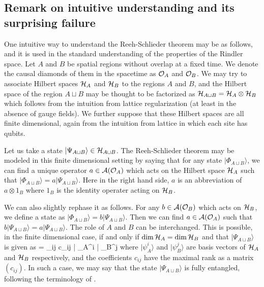 \documentclass[a4paper,11pt]{article}
\theoremstyle{plain}
\theoremstyle{definition}
\numberwithin{thm}{section}
\newcommand{\ket}[1]{ | {#1} \rangle }
\def\CA{{\cal A}}
\def\CH{{\cal H}}
\def\CO{{\cal O}}
\def\beq#1\eeq{\begin{align}#1\end{align}}
\begin{document}
\subsection{Remark on intuitive understanding and its surprising failure}


One intuitive way to understand the Reeh-Schlieder theorem may be as follows, and it is used in the standard understanding of the properties of the Rindler space.
Let $A$ and $B$ be spatial regions without overlap at a fixed time. We denote the causal diamonds of them in the spacetime as $\CO_A$ and $\CO_B$.
We may try to associate Hilbert spaces $\CH_A$ and $\CH_B$ to the regions $A$ and $B$, and the Hilbert space of the region $A \sqcup B$
may be thought to be factorized as $\CH_{A \sqcup B} =\CH_A \otimes \CH_B$ which follows from the intuition from lattice regularization (at least in the absence of gauge fields). 
We further suppose that these Hilbert spaces are all finite dimensional, again from the intuition from lattice in which each site has qubits.

Let us take a state $\ket{\Psi_{A \sqcup B}} \in \CH_{A \sqcup B}$. The Reeh-Schlieder theorem may be modeled in this finite dimensional setting
by saying that for any state $\ket{\Phi_{A \sqcup B}} $,
we can find a unique operator $a \in \CA(\CO_A)$ which acts on the Hilbert space $\CH_A$ such that $\ket{\Phi_{A \sqcup B}} = a \ket{\Psi_{A \sqcup B}}$.
Here in the right hand side, $a$ is an abbreviation of $a \otimes 1_B$ where $1_B$ is the identity operater acting on $\CH_B$.

We can also slightly rephase it as follows. For any $b \in \CA(\CO_B)$ which acts on $\CH_B$, we define a state as $\ket{\Phi_{A \sqcup B}} =b \ket{\Psi_{A \sqcup B}} $.
Then we can find $a \in \CA(\CO_A)$ such that $b \ket{\Psi_{A \sqcup B}} = a \ket{\Psi_{A \sqcup B}}$. The role of $A$ and $B$ can be interchanged.
This is possible, in the finite dimensional case, if and only if $\dim \CH_A = \dim \CH_B$ and that
$\ket{\Psi_{A \sqcup B}}$ is given as
\beq
\ket{\Psi_{A \sqcup B}} = \sum_{ij} c_{ij}\ket{\psi_A^i} \otimes \ket{\psi_B^j}
\eeq
where $\ket{\psi_A^i} $ and $ \ket{\psi_B^j}$ are basis vectors of $\CH_A$ and $\CH_B$ respectively, and the coefficients $c_{ij}$
have the maximal rank as a matrix $(c_{ij})$. In such a case, we may say that
the state $\ket{\Psi_{A \sqcup B}} $ is fully entangled, following the terminology of \cite{Witten:2018zxz}.
\end{document}
